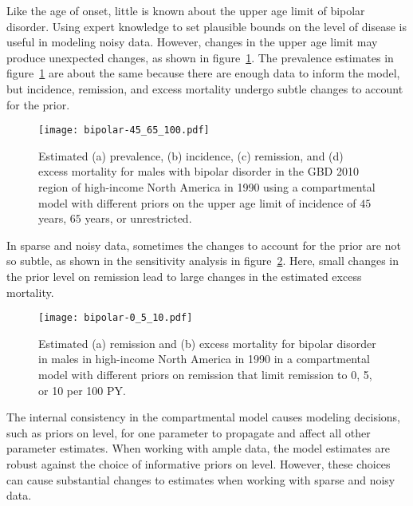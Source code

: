 Like the age of onset, little is known about the upper age limit of
bipolar disorder.  Using expert knowledge to set plausible bounds on the
level of disease is useful in modeling noisy data.  However, changes in the upper age
limit may produce unexpected changes, as shown in figure~\ref{fig:app-bipolar onset}.
The prevalence estimates in figure~\ref{fig:app-bipolar onset} are about
the same because there are enough data to inform the model, but incidence,
remission, and excess mortality undergo subtle changes to account for the prior.

    \begin{figure}[h]
        \begin{center}
            \texttt{[image: bipolar-45\_65\_100.pdf]}
            \caption[Comparison of estimates for bipolar disorder using
              a compartmental model with different priors on the upper
              age limit of incidence.]{Estimated (a) prevalence, (b)
              incidence, (c) remission, and
              (d) excess mortality for males with bipolar
              disorder in the GBD 2010 region of high-income North America
              in 1990 using a compartmental model with
              different priors on the upper age limit of
              incidence of $45$ years, $65$ years, or unrestricted.}
            \label{fig:app-bipolar onset}
        \end{center}
    \end{figure}

In sparse and noisy data, sometimes the changes to account for the prior
are not so subtle, as shown in the sensitivity analysis in
figure~\ref{fig:app-bipolar remission}.  Here, small changes in the
prior level on remission lead to large changes in the estimated excess mortality.

    \begin{figure}[h]
        \begin{center}
            \texttt{[image: bipolar-0\_5\_10.pdf]}
            \caption[Comparison of estimates for bipolar disorder using a
              compartmental model with different priors on remission.]{Estimated
              (a) remission and (b) excess
              mortality for bipolar disorder in
              males in high-income North America
              in 1990 in a compartmental model
              with different priors on remission that limit remission
              to 0, 5, or 10 per 100 PY.}
            \label{fig:app-bipolar remission}
        \end{center}
    \end{figure}

The internal consistency in the compartmental model causes modeling
decisions, such as priors on level, for one parameter to propagate and
affect all other parameter estimates.  When working with ample data,
the model estimates are robust against the choice of informative priors on
level.  However, these choices can cause substantial changes to
estimates when working with sparse and noisy data.





